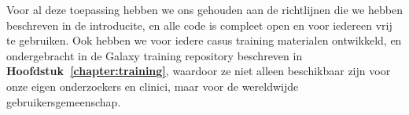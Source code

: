 Voor al deze toepassing hebben we ons gehouden aan de richtlijnen die we hebben beschreven in de introducite, en alle code is compleet open en voor iedereen vrij te gebruiken. Ook hebben we voor iedere casus training materialen ontwikkeld, en ondergebracht in de Galaxy training repository beschreven in \textbf{Hoofdstuk~\ref{chapter:training}}, waardoor ze niet alleen beschikbaar zijn voor onze eigen onderzoekers en clinici, maar voor de wereldwijde gebruikersgemeenschap.


